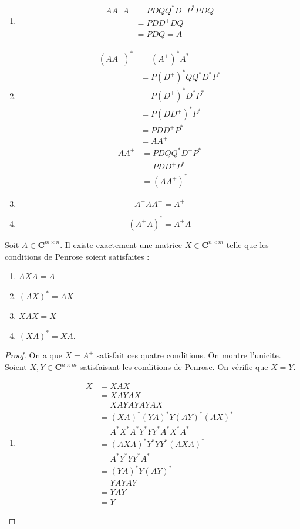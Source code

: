 \begin{proposition}
\begin{enumerate}
\item
\begin{align*}
AA^{+}A & =PDQQ^{*}D^{+}P^{*}PDQ \\
 & =PDD^{+}DQ \\
 & =PDQ=A
\end{align*}
\item 
\begin{align*}
(AA^{+})^{*} & =(A^{+})^{*}A^{*} \\
 & =P(D^{+})^{*}QQ^{*}D^{*}P^{*} \\
 & =P(D^{+})^{*}D^{*}P^{*} \\
 & =P(DD^{+})^{*}P^{*} \\
 & =PDD^{+}P^{*} \\
 & =AA^{+}
\end{align*}
\begin{align*}
AA^{+} & =PDQQ^{*}D^{+}P^{*} \\
 & =PDD^{+}P^{*}  \\
 & =(AA^{+})^{*}
\end{align*}
\item
$$
A^{+}AA^{+}=A^{+}
$$
\item 
$$
(A^{+}A)^{^{*}}=A^{+}A
$$

\end{enumerate}
\end{proposition}
\begin{theorem}
Soit $A\in \mathbf{C}^{m\times n}$. Il existe exactement une matrice $X\in \mathbf{C}^{n\times m}$ telle que les conditions de Penrose soient satisfaites :
\begin{enumerate}
\item $AXA=A$
\item $(AX)^{*}=AX$
\item $XAX=X$
\item $(XA)^{*}=XA$.
\end{enumerate}
\end{theorem}
\begin{proof}
On a que $X=A^{+}$ satisfait ces quatre conditions. On montre l'unicite. Soient $X,Y\in \mathbf{C}^{n\times m}$ satisfaisant les conditions de Penrose. On vérifie que $X=Y$.
\begin{enumerate}
\item 
\begin{align*}
X & =XAX  \\
 & =XAYAX \\
 & =XAYAYAYAX \\
 & =(XA)^{*}(YA)^{*}Y(AY)^{*}(AX)^{*} \\
 & =A^{*}X^{*}A^{*}Y^{*}YY^{*}A^{*}X^{*}A^{*} \\
 & =(AXA)^{*}Y^{*}YY^{*}(AXA)^{*} \\
 & =A^{*}Y^{*}YY^{*}A^{*} \\
 & =(YA)^{*}Y(AY)^{*} \\
 & =YAYAY \\
 & =YAY \\
 & =Y
\end{align*}
\end{enumerate}
\end{proof}
